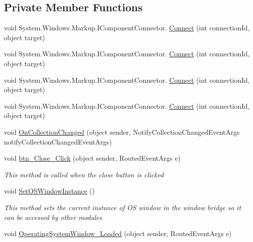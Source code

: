 \subsection*{Private Member Functions}
\begin{DoxyCompactItemize}
\item 
void System.\+Windows.\+Markup.\+I\+Component\+Connector. \hyperlink{class_c_p_u___o_s___simulator_1_1_operating_system_main_window_ad482fe0b46f681bb64b29500fa69b98b}{Connect} (int connection\+Id, object target)
\item 
void System.\+Windows.\+Markup.\+I\+Component\+Connector. \hyperlink{class_c_p_u___o_s___simulator_1_1_operating_system_main_window_ad482fe0b46f681bb64b29500fa69b98b}{Connect} (int connection\+Id, object target)
\item 
void System.\+Windows.\+Markup.\+I\+Component\+Connector. \hyperlink{class_c_p_u___o_s___simulator_1_1_operating_system_main_window_ad482fe0b46f681bb64b29500fa69b98b}{Connect} (int connection\+Id, object target)
\item 
void System.\+Windows.\+Markup.\+I\+Component\+Connector. \hyperlink{class_c_p_u___o_s___simulator_1_1_operating_system_main_window_ad482fe0b46f681bb64b29500fa69b98b}{Connect} (int connection\+Id, object target)
\item 
void \hyperlink{class_c_p_u___o_s___simulator_1_1_operating_system_main_window_aeda3cbb43fe602a4ba5325b0a8a9e2ee}{On\+Collection\+Changed} (object sender, Notify\+Collection\+Changed\+Event\+Args notify\+Collection\+Changed\+Event\+Args)
\item 
void \hyperlink{class_c_p_u___o_s___simulator_1_1_operating_system_main_window_a92ce496d30585ff30ac840fbeb7b8a16}{btn\+\_\+\+Close\+\_\+\+Click} (object sender, Routed\+Event\+Args e)
\begin{DoxyCompactList}\small\item\em This method is called when the close button is clicked \end{DoxyCompactList}\item 
void \hyperlink{class_c_p_u___o_s___simulator_1_1_operating_system_main_window_a0f58f20c1fe9dbc972fdf41ae871dea7}{Set\+O\+S\+Window\+Instance} ()
\begin{DoxyCompactList}\small\item\em This method sets the current instance of O\+S window in the window bridge so it can be accessed by other modules \end{DoxyCompactList}\item 
void \hyperlink{class_c_p_u___o_s___simulator_1_1_operating_system_main_window_a05b54ac7242f582757f99f3e7a6c48cf}{Operating\+System\+Window\+\_\+\+Loaded} (object sender, Routed\+Event\+Args e)

\end{DoxyCompactItemize}
